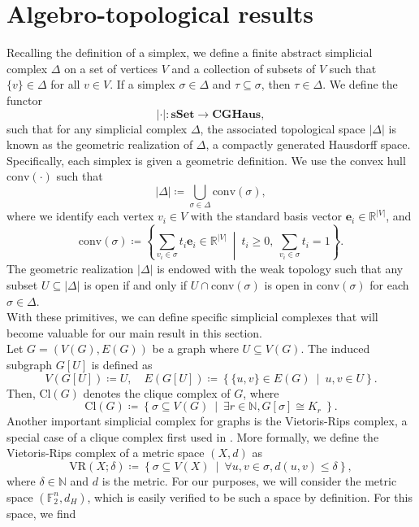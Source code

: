 \documentclass[12pt]{amsart}
\numberwithin{figure}{section}
\theoremstyle{plain}
\begin{document}
\section{Algebro-topological results}
\indent Recalling the definition of a simplex, we define a finite abstract simplicial complex $\Delta$ on a set of vertices $V$ and a collection of subsets of $V$ such that $\{v\}\in\Delta$ for all $v\in V$. If a simplex $\sigma\in\Delta$ and $\tau\subseteq\sigma$, then $\tau\in\Delta$. We define the functor 
\[|\cdot|:\mathbf{sSet}\to\mathbf{CGHaus},\] 
such that for any simplicial complex $\Delta$, the associated topological space $|\Delta|$ is known as the geometric realization of $\Delta$, a compactly generated Hausdorff space. Specifically, each simplex is given a geometric definition. We use the convex hull $\mathrm{conv}(\cdot)$ such that 
\[|\Delta| \coloneq \bigcup_{\sigma \in \Delta} \mathrm{conv}(\sigma),\]
where we identify each vertex $v_{i} \in V$ with the standard basis vector $\mathbf{e}_{i} \in \mathbb{R}^{|V|}$, and
\[\mathrm{conv}(\sigma) \coloneq \left\{ \sum_{v_i \in \sigma} t_{i} \mathbf{e}_{i} \in \mathbb{R}^{|V|} \ \middle| \ t_{i} \geq 0, \ \sum_{v_{i} \in \sigma} t_{i} = 1 \right\}.\]
The geometric realization $|\Delta|$ is endowed with the weak topology such that any subset $U \subseteq |\Delta|$ is open if and only if $U \cap \mathrm{conv}(\sigma)$ is open in $\mathrm{conv}(\sigma)$ for each $\sigma \in \Delta$.\\
\indent With these primitives, we can define specific simplicial complexes that will become valuable for our main result in this section.\\
\indent Let $G = (V(G), E(G))$ be a graph where $U\subseteq V(G)$. The induced subgraph $G[U]$ is defined as
\[V(G[U]) \coloneq U,\quad E(G[U])\coloneq\left\{\{u,v\}\in E(G)\:\middle|\:u,v\in U\right\}.\]
Then, $\mathrm{Cl}(G)$ denotes the clique complex of $G$, where
\[\mathrm{Cl}(G)\coloneq\left\{\sigma\subseteq V(G)\:\middle|\:\exists r\in\mathbb{N}, G[\sigma]\cong K_{r}\:\right\}.\]
Another important simplicial complex for graphs is the Vietoris-Rips complex, a special case of a clique complex first used in \cite{Vietoris27}. More formally, we define the Vietoris-Rips complex of a metric space $(X, d)$ as
\[\mathrm{VR}(X;\delta)\coloneq\left\{\sigma\subseteq V(X)\:\middle|\:\forall u, v\in\sigma, d(u,v)\leq\delta\right\},\]
where $\delta \in \mathbb{N}$ and $d$ is the metric. For our purposes, we will consider the metric space $(\mathbb{F}_{2}^{n}, d_{H})$, which is easily verified to be such a space by definition. For this space, we find
\end{document}
